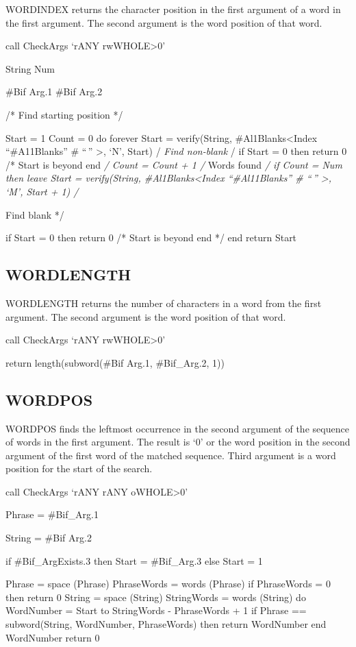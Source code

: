 WORDINDEX returns the character position in the first argument of a word
in the first argument. The second argument is the word position of that
word.

call CheckArgs `rANY rwWHOLE\textgreater0'

String Num

\#Bif Arg.1 \#Bif Arg.2

/* Find starting position */

Start = 1 Count = 0 do forever Start = verify(String,
\#Al1Blanks\textless Index ``\#A11Blanks'' \# ``\,'' \textgreater, `N',
Start) /\emph{ Find non-blank }/ if Start = 0 then return 0 /* Start is
beyond end \emph{/ Count = Count + 1 /} Words found \emph{/ if Count =
Num then leave Start = verify(String, \#Al1Blanks\textless Index
``\#Al11Blanks'' \# ``\,'' \textgreater, `M', Start + 1) /}

Find blank */

if Start = 0 then return 0 /* Start is beyond end */ end return Start

\hypertarget{wordlength}{%
\subsection{WORDLENGTH}\label{wordlength}}

WORDLENGTH returns the number of characters in a word from the first
argument. The second argument is the word position of that word.

call CheckArgs `rANY rwWHOLE\textgreater0'

return length(subword(\#Bif Arg.1, \#Bif\_Arg.2, 1))

\hypertarget{wordpos}{%
\subsection{WORDPOS}\label{wordpos}}

WORDPOS finds the leftmost occurrence in the second argument of the
sequence of words in the first argument. The result is `0' or the word
position in the second argument of the first word of the matched
sequence. Third argument is a word position for the start of the search.

call CheckArgs `rANY rANY oWHOLE\textgreater0'

Phrase = \#Bif\_Arg.1

String = \#Bif Arg.2

if \#Bif\_ArgExists.3 then Start = \#Bif\_Arg.3 else Start = 1

Phrase = space (Phrase) PhraseWords = words (Phrase) if PhraseWords = 0
then return 0 String = space (String) StringWords = words (String) do
WordNumber = Start to StringWords - PhraseWords + 1 if Phrase ==
subword(String, WordNumber, PhraseWords) then return WordNumber end
WordNumber return 0


